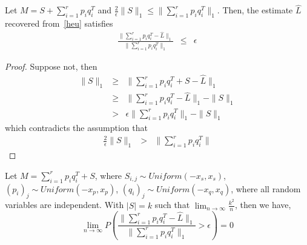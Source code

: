 \begin{prop}
Let $M=S+\sum_{i=1}^{r}p_{i}q_{i}^{T}$ and $\frac{2}{\epsilon}\|S\|_{1}\le\|\sum_{i=1}^{r}p_{i}q_{i}^{T}\|_{1}$. Then, the estimate $\hat{L}$ recovered from~\eqref{heu} satisfies
\begin{eqnarray*}
\frac{\|\sum_{i=1}^{r}p_{i}q_{i}^{T}-\hat{L}\|_{1}}{\|\sum_{i=1}^{r}p_{i}q_{i}^{T}\|_{1}} & \le & \epsilon
\end{eqnarray*}
\end{prop}
\begin{proof}
Suppose not, then
\begin{eqnarray*}
\|S\|_{1} & \ge & \|\sum_{i=1}^{r}p_{i}q_{i}^{T}+S-\hat{L}\|_{1}\\
 & \ge & \|\sum_{i=1}^{r}p_{i}q_{i}^{T}-\hat{L}\|_{1}-\|S\|_{1}\\
 & > & \epsilon\|\sum_{i=1}^{r}p_{i}q_{i}^{T}\|_{1}-\|S\|_{1}
\end{eqnarray*}
which contradicts the assumption that
\begin{eqnarray*}
\frac{2}{\epsilon}\|S\|_{1} & > & \|\sum_{i=1}^{r}p_{i}q_{i}^{T}\|
\end{eqnarray*}
\end{proof}

\begin{prop}
Let $M=\sum_{i=1}^{r}p_{i}q_{i}^{T}+S$, where $S_{i,j}\sim Uniform(-x_{s},x_{s})$,
$(p_{i})_{j}\sim Uniform(-x_{p},x_{p})$, $(q_{i})_{j}\sim Uniform(-x_{q},x_{q})$, where all random variables are independent. With $|S|=k$ such that
$\lim_{n\to\infty}\frac{k^{2}}{n}$, then we have,
\[
\lim_{n \to \infty} P \left( \frac{ \|\sum_{i=1}^{r} p_{i} q_{i}^{T} - \hat{L} \|_{1} }{ \| \sum_{i=1}^{r} p_{i} q_{i}^{T} \|_{1} } > \epsilon \right) = 0
\]
\end{prop}

